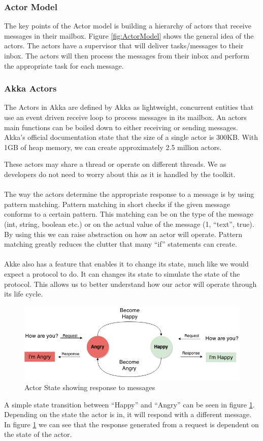 \subsubsection{Actor Model}
The key points of the Actor model is building a hierarchy of  actors that receive messages in their mailbox. Figure \ref{fig:ActorModel} shows the general idea of the actors. The actors have a supervisor that will deliver tasks/messages to their inbox. The actors will then process the messages from their inbox and perform the appropriate task for each message. 
\subsubsection{Akka Actors}
The Actors in Akka are defined by Akka as lightweight, concurrent entities that use an event driven receive loop to process messages in its mailbox. An actors main functions can be boiled down to either receiving or sending messages. Akka's official documentation state that the size of a single actor is 300KB. With 1GB of heap memory, we can create approximately 2.5 million actors. 

These actors may share a thread or operate on different threads. We as developers do not need to worry about this as it is handled by the toolkit.
\\\\
The way the actors determine the appropriate response to a message is by using pattern matching. Pattern matching in short checks if the given message conforms to a certain pattern. This matching can be on the type of the message (int, string, boolean etc.) or on the actual value of the message (1, ``text'', true). By using this we can raise abstraction on how an actor will operate. Pattern matching greatly reduces the clutter that many ``if'' statements can create.
\\\\
Akke also has a feature that enables it to change its state, much like we would expect a protocol to do. It can changes its state to simulate the state of the protocol. This allows us to better understand how our actor will operate through its life cycle.
\begin{figure}[h]
	\centering
	\includegraphics[scale=0.45]{images/tools/ActorState.png} 
	\caption{Actor State showing response to messages}
	\label{fig:ActorState}
\end{figure}
A simple state transition between ``Happy'' and ``Angry'' can be seen in figure \ref{fig:ActorState}. Depending on the state the actor is in, it will respond with a different message. In figure \ref{fig:ActorState} we can see that the response generated from a request is dependent on the state of the actor.


